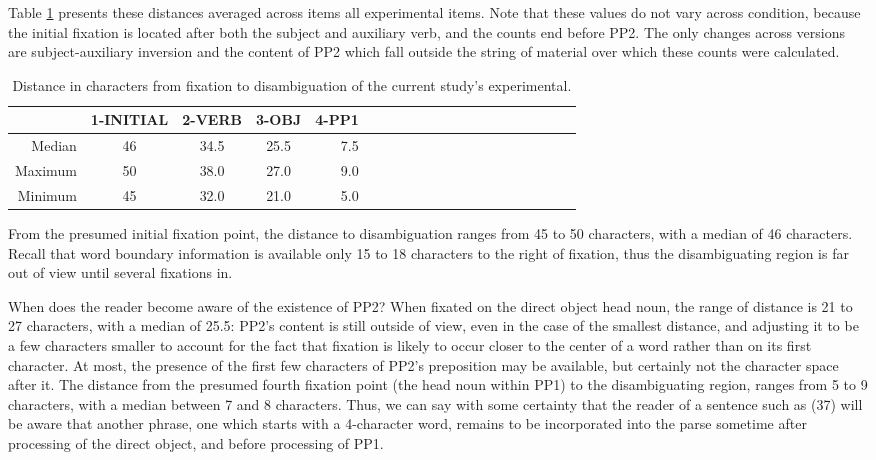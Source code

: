 \documentclass[11pt,oneside]{book}
\begin{document}
Table \ref{tab:dtcs} presents these distances averaged across items all experimental items. Note that these values do not vary across condition, because the initial fixation is located after both the subject and auxiliary verb, and the counts end before PP2. The only changes across versions are subject-auxiliary inversion and the content of PP2 which fall outside the string of material over which these counts were calculated.

\begin{table}[!h]

\caption{\label{tab:dtcs}Distance in characters from fixation to disambiguation of the current study's experimental.}
\centering
\begin{tabular}{rcccrcccrcccrcccrccc}
\toprule
  & 1-INITIAL & 2-VERB & 3-OBJ & 4-PP1\\
\midrule
Median & 46 & 34.5 & 25.5 & 7.5\\
Maximum & 50 & 38.0 & 27.0 & 9.0\\
Minimum & 45 & 32.0 & 21.0 & 5.0\\
\bottomrule
\end{tabular}
\end{table}

From the presumed initial fixation point, the distance to disambiguation ranges from 45 to 50 characters, with a median of 46 characters. Recall that word boundary information is available only 15 to 18 characters to the right of fixation, thus the disambiguating region is far out of view until several fixations in.

When does the reader become aware of the existence of PP2? When fixated on the direct object head noun, the range of distance is 21 to 27 characters, with a median of 25.5: PP2's content is still outside of view, even in the case of the smallest distance, and adjusting it to be a few characters smaller to account for the fact that fixation is likely to occur closer to the center of a word rather than on its first character. At most, the presence of the first few characters of PP2's preposition may be available, but certainly not the character space after it. The distance from the presumed fourth fixation point (the head noun within PP1) to the disambiguating region, ranges from 5 to 9 characters, with a median between 7 and 8 characters. Thus, we can say with some certainty that the reader of a sentence such as (37) will be aware that another phrase, one which starts with a 4-character word, remains to be incorporated into the parse sometime after processing of the direct object, and before processing of PP1.
\end{document}
